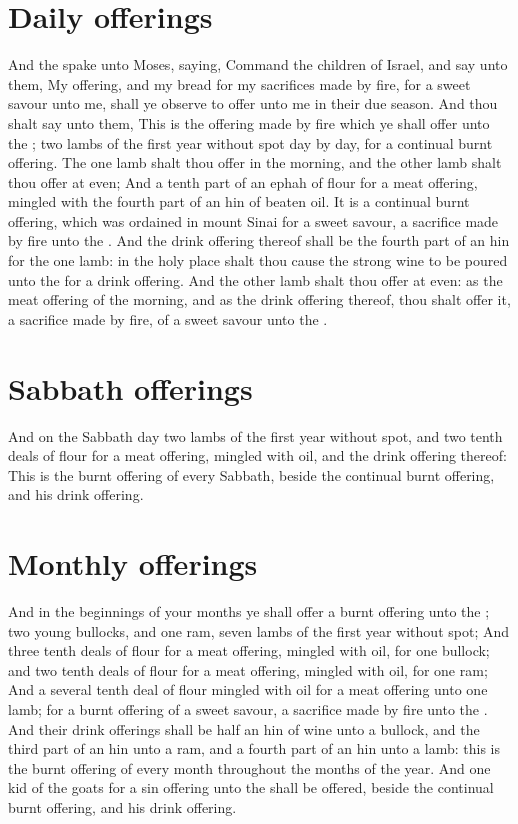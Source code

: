 \section*{Daily offerings}
\begin{biblechapter} %
\verse And the \LORD spake unto Moses, saying,
\verse Command the children of Israel, and say unto them, My offering, and my bread for my sacrifices made by fire, for a sweet savour unto me, shall ye observe to offer unto me in their due season.
\verse And thou shalt say unto them, This is the offering made by fire which ye shall offer unto the \LORD; two lambs of the first year without spot day by day, for a continual burnt offering.
\verse The one lamb shalt thou offer in the morning, and the other lamb shalt thou offer at even;
\verse And a tenth part of an ephah of flour for a meat offering, mingled with the fourth part of an hin of beaten oil.
\verse It is a continual burnt offering, which was ordained in mount Sinai for a sweet savour, a sacrifice made by fire unto the \LORD.
\verse And the drink offering thereof shall be the fourth part of an hin for the one lamb: in the holy place shalt thou cause the strong wine to be poured unto the \LORD for a drink offering.
\verse And the other lamb shalt thou offer at even: as the meat offering of the morning, and as the drink offering thereof, thou shalt offer it, a sacrifice made by fire, of a sweet savour unto the \LORD.
\section*{Sabbath offerings}
\verse And on the Sabbath day two lambs of the first year without spot, and two tenth deals of flour for a meat offering, mingled with oil, and the drink offering thereof:
\verse This is the burnt offering of every Sabbath, beside the continual burnt offering, and his drink offering.
\section*{Monthly offerings}
\verse And in the beginnings of your months ye shall offer a burnt offering unto the \LORD; two young bullocks, and one ram, seven lambs of the first year without spot;
\verse And three tenth deals of flour for a meat offering, mingled with oil, for one bullock; and two tenth deals of flour for a meat offering, mingled with oil, for one ram;
\verse And a several tenth deal of flour mingled with oil for a meat offering unto one lamb; for a burnt offering of a sweet savour, a sacrifice made by fire unto the \LORD.
\verse And their drink offerings shall be half an hin of wine unto a bullock, and the third part of an hin unto a ram, and a fourth part of an hin unto a lamb: this is the burnt offering of every month throughout the months of the year.
\verse And one kid of the goats for a sin offering unto the \LORD shall be offered, beside the continual burnt offering, and his drink offering.

\end{biblechapter}
